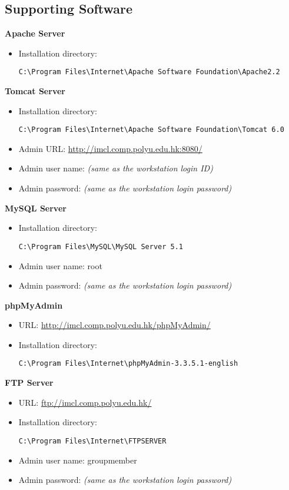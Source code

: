 \subsection{Supporting Software}
\textbf{Apache Server}
\begin{itemize}
\item Installation directory: \begin{verbatim}C:\Program Files\Internet\Apache Software Foundation\Apache2.2\end{verbatim}
\end{itemize}
\textbf{Tomcat Server}
\begin{itemize}
\item Installation directory: \begin{verbatim}C:\Program Files\Internet\Apache Software Foundation\Tomcat 6.0\end{verbatim}
\item Admin URL: \url{http://imcl.comp.polyu.edu.hk:8080/}
\item Admin user name: \emph{(same as the workstation login ID)}
\item Admin password: \emph{(same as the workstation login password)}
\end{itemize}
\textbf{MySQL Server}
\begin{itemize}
\item Installation directory: \begin{verbatim}C:\Program Files\MySQL\MySQL Server 5.1\end{verbatim}
\item Admin user name: root
\item Admin password: \emph{(same as the workstation login password)}
\end{itemize}
\textbf{phpMyAdmin}
\begin{itemize}
\item URL: \url{http://imcl.comp.polyu.edu.hk/phpMyAdmin/}
\item Installation directory: \begin{verbatim}C:\Program Files\Internet\phpMyAdmin-3.3.5.1-english\end{verbatim}
\end{itemize}
\textbf{FTP Server}
\begin{itemize}
\item URL: \url{ftp://imcl.comp.polyu.edu.hk/}
\item Installation directory: \begin{verbatim}C:\Program Files\Internet\FTPSERVER\end{verbatim}
\item Admin user name: groupmember
\item Admin password: \emph{(same as the workstation login password)}
\end{itemize}
